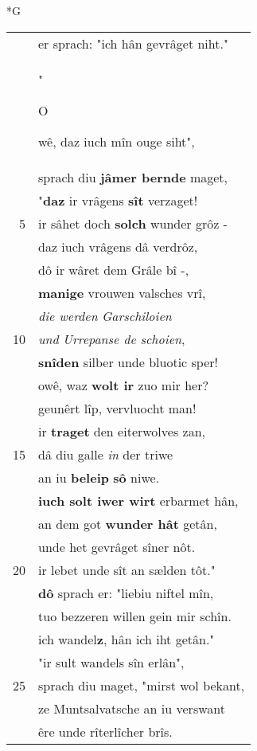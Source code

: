 \documentclass[8pt,a4paper,notitlepage]{article}
\begin{document}
\newpage
\begin{table}[ht]
\begin{minipage}[t]{0.5\linewidth}
\small
\begin{center}*G
\end{center}
\begin{tabular}{rl}
 & er sprach: "ich hân gevrâget niht."\\ 
 & "\begin{large}O\end{large}wê, daz iuch mîn ouge siht",\\ 
 & sprach diu \textbf{jâmer bernde} maget,\\ 
 & "\textbf{daz} ir vrâgens \textbf{sît} verzaget!\\ 
5 & ir sâhet doch \textbf{solch} wunder grôz -\\ 
 & daz iuch vrâgens dâ verdrôz,\\ 
 & dô ir wâret dem Grâle bî -,\\ 
 & \textbf{manige} vrouwen valsches vrî,\\ 
 & \textit{die werden} \textit{Garschiloien}\\ 
10 & \textit{und} \textit{Urrepanse de schoien},\\ 
 & \textbf{snîden} silber unde bluotic sper!\\ 
 & owê, waz \textbf{wolt ir} zuo mir her?\\ 
 & geunêrt lîp, vervluocht man!\\ 
 & ir \textbf{traget} den eiterwolves zan,\\ 
15 & dâ diu galle \textit{in} der triwe\\ 
 & an iu \textbf{beleip} \textbf{sô} niwe.\\ 
 & \textbf{iuch solt iwer wirt} erbarmet hân,\\ 
 & an dem got \textbf{wunder hât} getân,\\ 
 & unde het gevrâget sîner nôt.\\ 
20 & ir lebet unde sît an sælden tôt."\\ 
 & \textbf{dô} sprach er: "liebiu niftel mîn,\\ 
 & tuo bezzeren willen gein mir schîn.\\ 
 & ich wandel\textbf{z}, hân ich iht getân."\\ 
 & "ir sult wandels sîn erlân",\\ 
25 & sprach diu maget, "mirst wol bekant,\\ 
 & ze Muntsalvatsche an iu verswant\\ 
 & êre unde rîterlîcher brîs.\\ 

\end{tabular}
\end{minipage}
\end{table}
\end{document}
